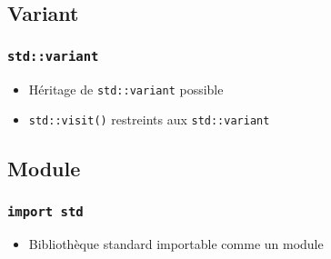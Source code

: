 \documentclass[C++.tex]{subfiles}
\begin{document}
\subsection*{Variant}
\begin{frame}[fragile]
	\frametitle{\lstinline|std::variant|}
	\begin{itemize}
		\item Héritage de \lstinline|std::variant| possible
		\item \lstinline|std::visit()| restreints aux \lstinline|std::variant|

	\end{itemize}
\end{frame}

\subsection*{Module}
\begin{frame}[fragile]
	\frametitle{\lstinline|import std|}
	\begin{itemize}
		\item Bibliothèque standard importable comme un module
	\end{itemize}
\end{frame}
\end{document}
